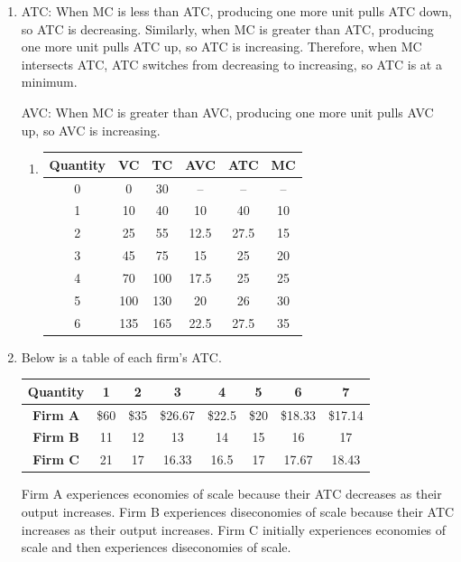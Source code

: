 \documentclass{article}
\begin{document}
\begin{enumerate}
\item ATC: When MC is less than ATC, producing one more unit pulls ATC down, so ATC is decreasing. Similarly, when MC is greater than ATC, producing one more unit pulls ATC up, so ATC is increasing. Therefore, when MC intersects ATC, ATC switches from decreasing to increasing, so ATC is at a minimum.

AVC: When MC is greater than AVC, producing one more unit pulls AVC up, so AVC is increasing.

	\begin{enumerate}
	
	\item \phantom{x}
	
	\begin{center}
	\begin{tabular}{c | c | c | c | c | c}
	Quantity & VC & TC & AVC & ATC & MC\\
	\hline
	0 & 0 & 30 & -- & -- & -- \\
	1 & 10 & 40 & 10 & 40 & 10 \\
	2 & 25 & 55 & 12.5 & 27.5 & 15 \\
	3 & 45 & 75 & 15 & 25 & 20 \\
	4 & 70 & 100 & 17.5 & 25 & 25 \\
	5 & 100 & 130 & 20 & 26 & 30 \\
	6 & 135 & 165 & 22.5 & 27.5 & 35
	\end{tabular}
	\end{center}
	
	\end{enumerate}
	
\item Below is a table of each firm's ATC.

	\begin{center}
	\begin{tabular}{| c | c | c | c | c | c | c | c |}
	\hline
	\textbf{Quantity} & 1 & 2 & 3 & 4 & 5 & 6 & 7 \\
	\hline
	\textbf{Firm A} & \$60 & \$35 & \$26.67 & \$22.5 & \$20 & \$18.33 & \$17.14 \\
	\hline
	\textbf{Firm B} & 11 & 12 & 13 & 14 & 15 & 16 & 17 \\
	\hline
	\textbf{Firm C} & 21 & 17 & 16.33 & 16.5 & 17 & 17.67 & 18.43 \\
	\hline
	\end{tabular}
	\end{center}
	
	Firm A experiences economies of scale because their ATC decreases as their output increases. Firm B experiences diseconomies of scale because their ATC increases as their output increases. Firm C initially experiences economies of scale and then experiences diseconomies of scale.

\end{enumerate}
\end{document}
